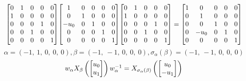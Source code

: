 \documentclass[11pt]{article}
\theoremstyle{definition}
\begin{document}
\[
\scaletoalign{\textwidth}{{\left[\begin{matrix}0 & 1 & 0 & 0 & 0\\1 & 0 & 0 & 0 & 0\\0 & 0 & 0 & 1 & 0\\0 & 0 & 1 & 0 & 0\\0 & 0 & 0 & 0 & 1\end{matrix}\right]} {\left[\begin{matrix}1 & 0 & 0 & 0 & 0\\0 & 1 & 0 & 0 & 0\\- u_{0} & 0 & 1 & 0 & 0\\0 & 0 & 0 & 1 & 0\\0 & 0 & 0 & 0 & 1\end{matrix}\right]} {\left[\begin{matrix}0 & 1 & 0 & 0 & 0\\1 & 0 & 0 & 0 & 0\\0 & 0 & 0 & 1 & 0\\0 & 0 & 1 & 0 & 0\\0 & 0 & 0 & 0 & 1\end{matrix}\right]} = {\left[\begin{matrix}1 & 0 & 0 & 0 & 0\\0 & 1 & 0 & 0 & 0\\0 & 0 & 1 & 0 & 0\\0 & - u_{0} & 0 & 1 & 0\\0 & 0 & 0 & 0 & 1\end{matrix}\right]}}
\]
\[
\alpha = \left( -1, \  1, \  0, \  0, \  0\right), \beta = \left( -1, \  -1, \  0, \  0, \  0\right), \sigma_{\alpha}(\beta) = \left( -1, \  -1, \  0, \  0, \  0\right)
\]
\[
\scaletoalign{\textwidth}{w_{\alpha} X_{\beta}\left(\left[\begin{matrix}u_{0}\\u_{1}\end{matrix}\right]\right) w_{\alpha}^{-1} = X_{\sigma_{\alpha}\left(\beta\right)}\left(\left[\begin{matrix}u_{0}\\- u_{1}\end{matrix}\right]\right)}
\]
\end{document}
